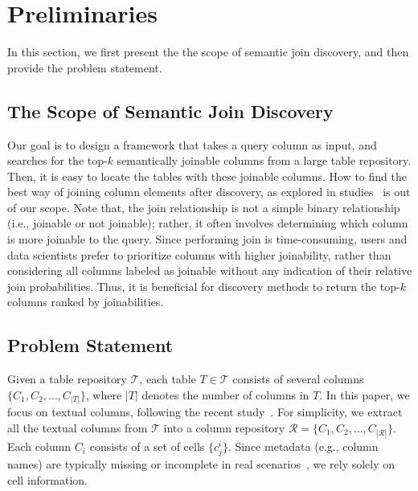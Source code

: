 \section{Preliminaries}
\label{sec:pre}

In this section, we first present the the scope of semantic join discovery, and then provide the problem statement.

\subsection{The Scope of Semantic Join Discovery}
\label{subsec: scope}
Our goal is to design a framework that takes a query column as input, and searches for the top-$k$ semantically joinable columns from a large table repository. Then, it is easy to locate the tables with these joinable columns.
How to find the best way of joining column elements after discovery, as explored in studies~\cite{semanticjoin,autofuzzyjoin,Auto-Join} is out of our scope.
Note that, the join relationship is not a simple binary relationship (i.e., joinable or not joinable); rather, it often involves determining which column is more joinable to the query.
Since performing join is time-consuming, users and data scientists prefer to prioritize columns with higher joinability, rather than considering all columns labeled as joinable without any indication of their relative join probabilities.
Thus, it is beneficial for discovery methods to return the top-$k$ columns ranked by joinabilities.


\subsection{Problem Statement}
\label{subsec: prob}

Given a table repository $\mathcal{T}$, each table $T \in \mathcal{T}$ consists of several columns $\{C_1, C_2, \dots, C_{|T|}\}$, where $|T|$ denotes the number of columns in $T$.
In this paper, we focus on  textual columns, following the recent study~\cite{Deepjoin}.
For simplicity, we extract all the textual columns from $\mathcal{T}$ into a column repository $\mathcal{R} =\{C_1, C_2, \dots, C_{|\mathcal{R}|} \}$.  Each column $C_i$ consists of a set of cells $\{c_j^i\}$. Since metadata (e.g., column names) are typically missing or incomplete in real scenarios~\cite{NargesianZMPA19}, we rely solely on cell information.

